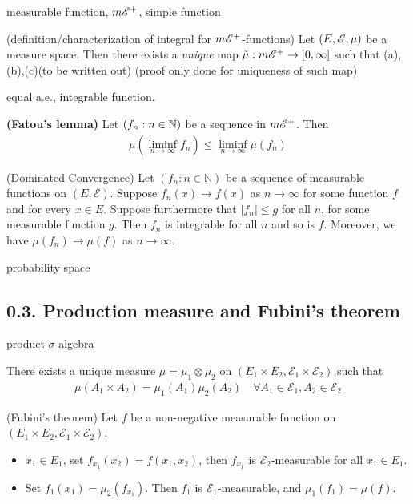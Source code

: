 \documentclass[10pt,a4paper]{report}
\begin{document}
measurable function, $m\mathscr{E}^+$, simple function

 (definition/characterization of integral for $m\mathscr{E}^+$-functions) Let $(E,\mathscr{E}, \mu)$ be a measure space. Then there exists a \textit{unique} map $\tilde{\mu} : m \mathscr{E}^+ \rightarrow [0,\infty]$ such that (a),(b),(c)(to be written out) (proof only done for uniqueness of such map)
\s

equal a.e., integrable function. 
\s

 \textbf{(Fatou's lemma)} Let $(f_n:n\in \mathbb{N})$ be a sequence in $m\mathscr{E}^+$. Then
\begin{align*}
\mu(\liminf_{n\rightarrow \infty} f_n) \leq \liminf_{n\rightarrow \infty} \mu(f_n)
\end{align*}
\s

(Dominated Convergence) Let $(f_n :n \in \mathbb{N})$ be a sequence of measurable functions on $(E,\mathscr{E})$. Suppose $f_n(x) \rightarrow f(x)$ as $n\rightarrow \infty$ for some function $f$ and for every $x\in E$. Suppose furthermore that $|f_n| \leq g$ for all $n$, for some measurable function $g$. Then $f_n$ is integrable for all $n$ and so is $f$. Moreover, we have $\mu(f_n) \rightarrow \mu(f)$ as $n\rightarrow \infty$.
\s

probability space

\subsection*{0.3. Production measure and Fubini's theorem}

product $\sigma$-algebra
\s

 There exists a unique measure $\mu = \mu_1 \otimes \mu_2$ on $(E_1 \times E_2, \mathscr{E}_1 \times \mathscr{E}_2)$ such that
\begin{align*}
\mu(A_1 \times A_2) = \mu_1(A_1) \mu_2(A_2) \quad \forall A_1 \in \mathscr{E}_1, A_2 \in \mathscr{E}_2
\end{align*}
\s

 (Fubini's theorem) Let $f$ be a non-negative measurable function on $(E_1 \times E_2, \mathscr{E}_1 \times \mathscr{E}_2)$.

\begin{itemize}
\item $x_1 \in E_1$, set $f_{x_1} (x_2) = f(x_1, x_2)$, then $f_{x_1}$ is $\mathscr{E_2}$-measurable for all $x_1 \in E_1$.

\item Set $f_1(x_1) = \mu_2(f_{x_1})$. Then $f_1$ is $\mathscr{E}_1$-measurable, and $\mu_1(f_1) = \mu(f)$.
\end{itemize} 
\end{document}
